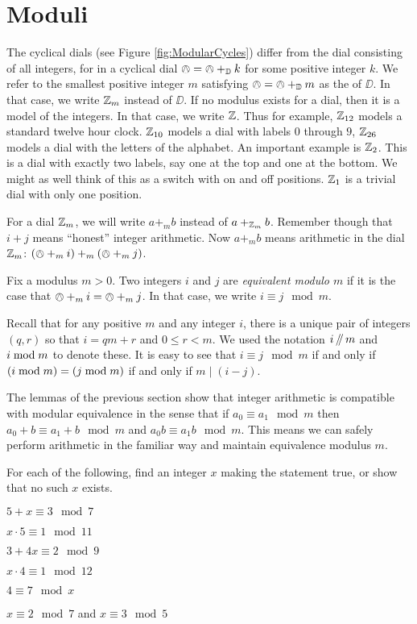 \section*{Moduli}

The cyclical dials (see Figure \ref{fig:ModularCycles}) differ from the dial consisting of all integers, for in a cyclical dial $\owedge = \owedge +_{\mathbb D} k$ for some positive integer $k$. We refer to the smallest positive integer $m$ satisfying $\owedge = \owedge +_{\mathbb D} m$ as the  of $\DD$. In that case, we write ${\mathbb Z}_m$ instead of $\DD$. If no modulus exists for a dial, then it is a model of the integers. In that case, we write ${\mathbb Z}$. 
Thus for example, ${\mathbb Z}_{12}$ models a standard twelve hour clock. ${\mathbb Z}_{10}$ models a dial with labels $0$ through $9$, ${\mathbb Z}_{26}$ models a dial with the letters of the alphabet. An important example is ${\mathbb Z}_2$. This is a dial with exactly two labels, say one at the top and one at the bottom. We might as well think of this as a switch with on and off positions. ${\mathbb Z}_1$ is a trivial dial with only one position.

For a dial ${\mathbb Z}_m$, we will write $a +_m b$ instead of $a +_{{\mathbb Z}_m} b$. Remember though that $i+j$ means ``honest'' integer arithmetic. Now $a +_m b$ means arithmetic in the dial ${\mathbb Z}_m$: $(\owedge +_m i)+_m(\owedge +_m j)$. 

\begin{defn}\label{def:modulus}
	Fix a modulus $m>0$. Two integers $i$ and $j$ are \emph{equivalent modulo $m$} if it is the case that $\owedge +_m i = \owedge +_m j$. In that case, we write $i\equiv j\mod m$. 
\end{defn}

Recall that for any positive $m$ and any integer $i$, there is a unique pair of integers $(q,r)$ so that $i = qm + r$ and $0\leq r < m$. We used the notation $i\mathop{/\mkern-5mu/} m$ and $i\bmod m$ to denote these. It is easy to see that
$i \equiv j \mod m$ if and only if $(i\bmod m)=(j\bmod m)$ if and only if $m\mid (i-j)$.

The lemmas of the previous section show that integer arithmetic is compatible with modular equivalence in the sense that if $a_0\equiv a_1\mod m$ then $a_0 + b \equiv a_1 + b\mod m$ and $a_0b\equiv a_1b\mod m$. This means we can safely perform arithmetic in the familiar way and maintain equivalence modulus $m$. 

\begin{exer}
	For each of the following, find an integer $x$ making the statement true, or show that no such $x$ exists.
	\begin{exercise}
		\item $5 + x \equiv 3 \mod 7$
		\item $x\cdot 5\equiv 1 \mod 11$
		\item $3 + 4x \equiv 2\mod 9$
		\item $x\cdot 4 \equiv 1\mod 12$
		\item $4 \equiv 7 \mod x$
		\item $x\equiv 2\mod 7$ and $x\equiv 3\mod 5$
	\end{exercise}
\end{exer}

